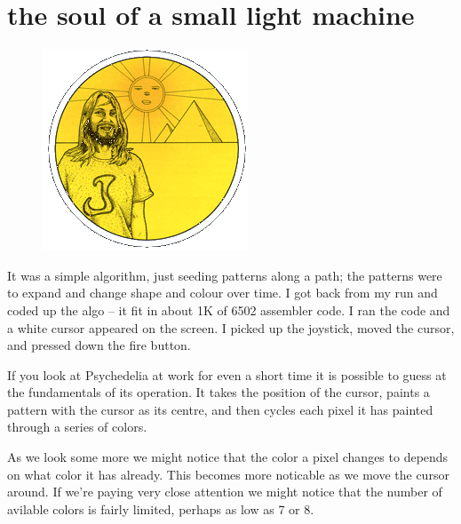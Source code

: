 \chapter{the soul of a small light machine} 
\label{sec:listing_pattern}
\lstset{style=6502Style}
\begin{definition}
\setlength{\intextsep}{0pt}%
\setlength{\columnsep}{3pt}%
\begin{figure}
\includegraphics[width=\linewidth]{src/callout/psych.png} 
\end{figure}
\small
It was a simple algorithm, just seeding patterns along a path; the patterns
  were to expand and change shape and colour over time. I got back from my run
  and coded up the algo – it fit in about 1K of 6502 assembler code. I ran the
  code and a white cursor appeared on the screen. I picked up the joystick,
  moved the cursor, and pressed down the fire button.
\end{definition}

If you look at Psychedelia at work for even a short time it is possible to guess at the fundamentals
of its operation. It takes the position of the cursor, paints a pattern with the cursor as its centre,
and then cycles each pixel it has painted through a series of colors.

As we look some more we might notice that the color a pixel changes to depends on what color it has already.
This becomes more noticable as we move the cursor around. If we're paying very close attention we might notice
that the number of avilable colors is fairly limited, perhaps as low as 7 or 8.

